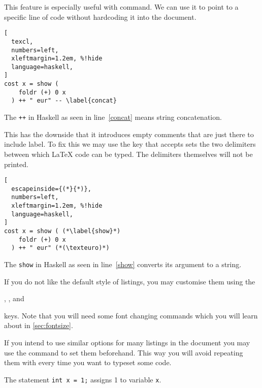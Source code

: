 This feature is especially useful with  command. We can use it to
point to a specific line of code without hardcoding it into the document.
\begin{example}
\begin{lstlisting}[
  texcl,
  numbers=left,
  xleftmargin=1.2em, %!hide
  language=haskell,
]
cost x = show (
    foldr (+) 0 x 
  ) ++ " eur" -- \label{concat}
\end{lstlisting}
The \lstinline|++| in Haskell
as seen in line~\ref{concat}
means string concatenation.
\end{example}
This has the downside that it introduces empty comments that are just there to
include label. To fix this we may use the  key that accepts
sets the two delimiters between which \LaTeX{} code can be typed. The
delimiters themselves will not be printed.
\begin{example}
  \begin{lstlisting}[
  escapeinside={(*}{*)},
  numbers=left,
  xleftmargin=1.2em, %!hide
  language=haskell,
]
cost x = show ( (*\label{show}*)
    foldr (+) 0 x 
  ) ++ " eur" (*(\texteuro)*)
\end{lstlisting}
The \lstinline|show| in Haskell
as seen in line~\ref{show}
converts its argument to a string.
\end{example}

If you do not like the default style of listings, you may customise them using
the
\begin{lscommand}
  , ,  and
\end{lscommand}
keys. Note that you will need some font changing commands which
you will learn about in \autoref{sec:fontsize}.
\begin{example}[examplewidth=0.55\linewidth]

\end{example}

If you intend to use similar options for many listings in the document you may
use the  command to set them beforehand. This way you will avoid
repeating them with every time you want to typeset some code.

\begin{example}[examplewidth=0.55\linewidth]
\lstset{
  language=C,
  numbers=left,
  xleftmargin=1.2em, %
  breaklines,
  basicstyle=\ttfamily,
  prebreak=\textrightarrow,
}



The statement
\lstinline|int x = 1;|
assigns 1 to variable
\lstinline|x|.
\end{example}

